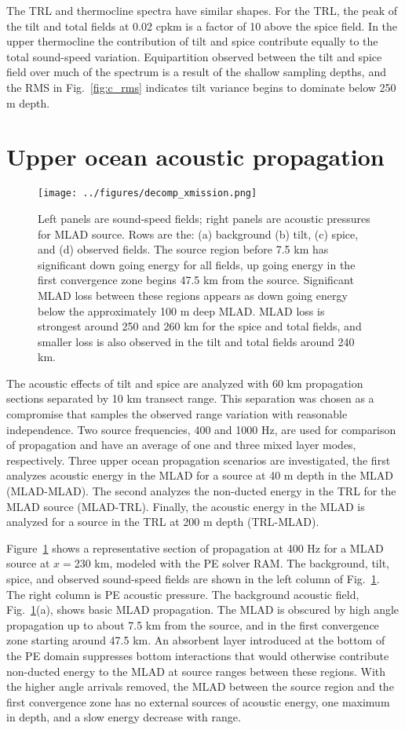 \documentclass[preprint,NumberedRefs]{JASA}
\begin{document}
The TRL and thermocline spectra have similar shapes. For the TRL, the peak of the tilt and total fields at 0.02 cpkm is a factor of 10 above the spice field. In the upper thermocline the contribution of tilt and spice contribute equally to the total sound-speed variation. Equipartition observed between the tilt and spice field over much of the spectrum is a result of the shallow sampling depths, and the RMS in Fig.~\ref{fig:c_rms} indicates tilt variance begins to dominate below 250 m depth.

\section{\label{sec:propagation}Upper ocean acoustic propagation}
\begin{figure}
\texttt{[image: ../figures/decomp\_xmission.png]}
    \caption{\label{fig:decomp_x}{Left panels are sound-speed fields; right panels are acoustic pressures for MLAD source. Rows are the: (a) background (b) tilt, (c) spice, and (d) observed fields. The source region before 7.5 km has significant down going energy for all fields, up going energy in the first convergence zone begins 47.5 km from the source. Significant MLAD loss between these regions appears as down going energy below the approximately 100 m deep MLAD. MLAD loss is strongest around 250 and 260 km for the spice and total fields, and smaller loss is also observed in the tilt and total fields around 240 km.}}
\end{figure}

The acoustic effects of tilt and spice are analyzed with 60 km propagation sections separated by 10 km transect range. This separation was chosen as a compromise that samples the observed range variation with reasonable independence. Two source frequencies, 400 and 1000 Hz, are used for comparison of propagation and have an average of one and three mixed layer modes, respectively. Three upper ocean propagation scenarios are investigated, the first analyzes acoustic energy in the MLAD for a source at 40 m depth in the MLAD (MLAD-MLAD). The second analyzes the non-ducted energy in the TRL for the MLAD source (MLAD-TRL). Finally, the acoustic energy in the MLAD is analyzed for a source in the TRL at 200 m depth (TRL-MLAD).

Figure~\ref{fig:decomp_x} shows a representative section of propagation at 400 Hz for a MLAD source at $x=$230 km, modeled with the PE solver RAM.\citep{collins93} The background, tilt, spice, and observed sound-speed fields are shown in the left column of Fig.~\ref{fig:decomp_x}. The right column is PE acoustic pressure. The background acoustic field, Fig.~\ref{fig:decomp_x}(a), shows basic MLAD propagation. The MLAD is obscured by high angle propagation up to about 7.5 km from the source, and in the first convergence zone starting around 47.5 km. An absorbent layer introduced at the bottom of the PE domain suppresses bottom interactions that would otherwise contribute non-ducted energy to the MLAD at source ranges between these regions. With the higher angle arrivals removed, the MLAD between the source region and the first convergence zone has no external sources of acoustic energy, one maximum in depth, and a slow energy decrease with range.
\end{document}
